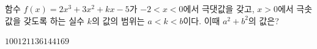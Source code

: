 함수 $f(x)=2x^3+3x^2+kx-5$가 $-2<x<0$에서 극댓값을 갖고, $x>0$에서 극솟값을 갖도록 하는 실수 $k$의 값의 범위는 $a<k<b$이다. 이때 $a^2+b^2$의 값은?
\begin{choices32}{$100$}{$121$}{$136$}{$144$}{$169$}\end{choices32}

